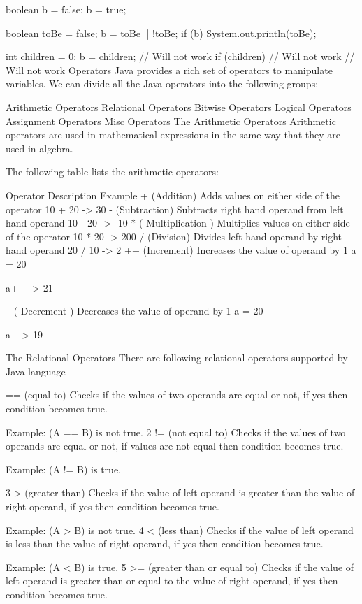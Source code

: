 boolean b = false;
b = true;

boolean toBe = false;
b = toBe || !toBe;
if (b) {
    System.out.println(toBe);
}

int children = 0;
b = children; // Will not work
if (children) { // Will not work
    // Will not work
}
Operators
Java provides a rich set of operators to manipulate variables. We can divide all the Java operators into the following groups:

Arithmetic Operators
Relational Operators
Bitwise Operators
Logical Operators
Assignment Operators
Misc Operators
The Arithmetic Operators
Arithmetic operators are used in mathematical expressions in the same way that they are used in algebra.

The following table lists the arithmetic operators:

Operator	Description	Example
+ (Addition)	Adds values on either side of the operator	10 + 20 -> 30
- (Subtraction)	Subtracts right hand operand from left hand operand	10 - 20 -> -10
* ( Multiplication )	Multiplies values on either side of the operator	10 * 20 -> 200
/ (Division)	Divides left hand operand by right hand operand	20 / 10 -> 2
++ (Increment)	Increases the value of operand by 1
a = 20

a++ -> 21

-- ( Decrement )	Decreases the value of operand by 1
a = 20

a-- -> 19

The Relational Operators
There are following relational operators supported by Java language

== (equal to) Checks if the values of two operands are equal or not, if yes then condition becomes true.

Example: (A == B) is not true. 2 != (not equal to) Checks if the values of two operands are equal or not, if values are not equal then condition becomes true.

Example: (A != B) is true.

3 > (greater than) Checks if the value of left operand is greater than the value of right operand, if yes then condition becomes true.

Example: (A > B) is not true. 4 < (less than) Checks if the value of left operand is less than the value of right operand, if yes then condition becomes true.

Example: (A < B) is true. 5 >= (greater than or equal to) Checks if the value of left operand is greater than or equal to the value of right operand, if yes then condition becomes true.

